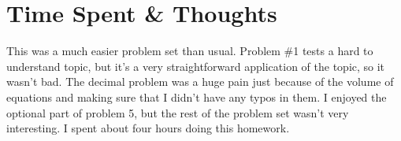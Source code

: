 \documentclass[12pt]{article}
\begin{document}
\section{Time Spent \& Thoughts}

This was a much easier problem set than usual. Problem \#1 tests a hard to understand topic, but it's a very straightforward application of the topic, so it wasn't bad. The decimal problem was a huge pain just because of the volume of equations and making sure that I didn't have any typos in them. I enjoyed the optional part of problem 5, but the rest of the problem set wasn't very interesting. I spent about four hours doing this homework.
\end{document}
